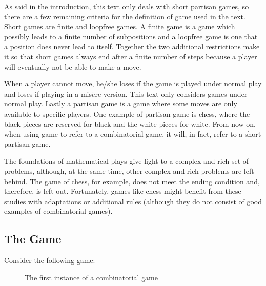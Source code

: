 As said in the introduction, this text only deals with short partisan games, so there are a few remaining criteria for the definition of game used in the text. Short games are finite and loopfree games. A finite game is a game which possibly leads to a finite number of subpositions and a loopfree game is one that a position does never lead to itself. Together the two additional restrictions make it so that short games always end after a finite number of steps because a player will eventually not be able to make a move.

When a player cannot move, he/she loses if the game is played under normal play and loses if playing in a mis$\acute{e}$re version. This text only considers games under normal play. Lastly a partisan game is a game where some moves are only available to specific players. One example of partisan game is chess, where the black pieces are reserved for black and the white pieces for white. From now on, when using game to refer to a combinatorial game, it will, in fact, refer to a short partisan game.  

The foundations of mathematical plays give light to a complex and rich set of problems, although, at the same time, other complex and rich problems are left behind. The game of chess, for example, does not meet the ending condition and, therefore, is left out. Fortunately, games like chess might benefit from these studies with adaptations or additional rules (although they do not consist of good examples of combinatorial games).\\

\subsection*{The Game}

Consider the following game:\\

\begin{figure} [!ht]
\begin{center}
\end{center}
\caption{The first instance of a combinatorial game}
\end{figure}


